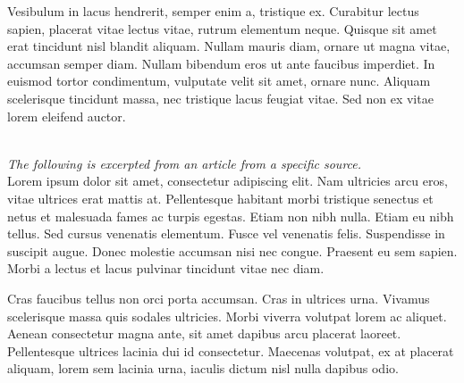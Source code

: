 \documentclass[12pt, letterpaper]{article}
\begin{document}
Vesibulum in lacus hendrerit, semper enim a, tristique ex. Curabitur lectus sapien, placerat vitae lectus vitae, rutrum elementum neque. Quisque sit amet erat tincidunt nisl blandit aliquam. Nullam mauris diam, ornare ut magna vitae, accumsan semper diam. Nullam bibendum eros ut ante faucibus imperdiet. In euismod tortor condimentum, vulputate velit sit amet, ornare nunc. Aliquam scelerisque tincidunt massa, nec tristique lacus feugiat vitae. Sed non ex vitae lorem eleifend auctor.
    
{\newpage}
\centering
    \vspace{5mm}
    {}\\
    \vspace{5mm}
    \justifying
    \textit{The following is excerpted from an article from a specific source.}\vspace{2.5mm}\\
Lorem ipsum dolor sit amet, consectetur adipiscing elit. Nam ultricies arcu eros, vitae ultrices erat mattis at. Pellentesque habitant morbi tristique senectus et netus et malesuada fames ac turpis egestas. Etiam non nibh nulla. Etiam eu nibh tellus. Sed cursus venenatis elementum. Fusce vel venenatis felis. Suspendisse in suscipit augue. Donec molestie accumsan nisi nec congue. Praesent eu sem sapien. Morbi a lectus et lacus pulvinar tincidunt vitae nec diam.

Cras faucibus tellus non orci porta accumsan. Cras in ultrices urna. Vivamus scelerisque massa quis sodales ultricies. Morbi viverra volutpat lorem ac aliquet. Aenean consectetur magna ante, sit amet dapibus arcu placerat laoreet. Pellentesque ultrices lacinia dui id consectetur. Maecenas volutpat, ex at placerat aliquam, lorem sem lacinia urna, iaculis dictum nisl nulla dapibus odio.
\end{document}
